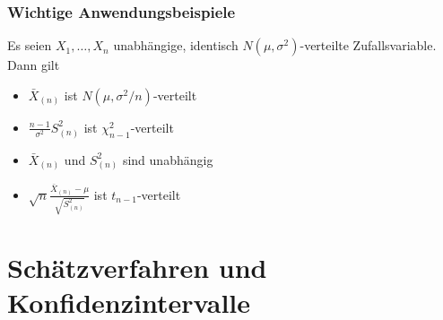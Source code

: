 \documentclass[
	ngerman,
	accentcolor=9c,%
	type=intern,
	marginpar=false
	]{tudapub}
\begin{document}
        \subsubsection{Wichtige Anwendungsbeispiele}
            \begin{satz}
                Es seien $X_1,\dots,X_n$ unabhängige, identisch $N(\mu,\sigma^2)$-verteilte Zufallsvariable. Dann gilt
                \begin{itemize}
                    \item $\bar{X}_{(n)} $ ist $ N(\mu, \sigma^2/n)$-verteilt
                    \item $\frac{n-1}{\sigma^2}S^2_{(n)} $ ist $ \chi_{n-1}^2$-verteilt
                    \item $\bar{X}_{(n)} $ und $S^2_{(n)}$ sind unabhängig
                    \item $\sqrt{n}\frac{\bar{X}_{(n)}- \mu}{\sqrt{S^2_{(n)}}}$ ist $t_{n-1}$-verteilt
                \end{itemize}
            \end{satz}\newpage
    \section{Schätzverfahren und Konfidenzintervalle}
\end{document}
